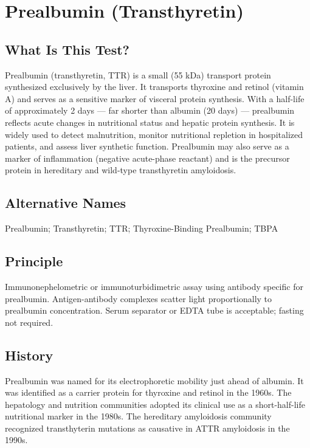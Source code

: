 \chapter{Prealbumin (Transthyretin)}

\section*{What Is This Test?}
Prealbumin (transthyretin, TTR) is a small (55 kDa) transport protein synthesized exclusively by the liver. It transports thyroxine and retinol (vitamin A) and serves as a sensitive marker of visceral protein synthesis. With a half-life of approximately 2 days --- far shorter than albumin (20 days) --- prealbumin reflects acute changes in nutritional status and hepatic protein synthesis. It is widely used to detect malnutrition, monitor nutritional repletion in hospitalized patients, and assess liver synthetic function. Prealbumin may also serve as a marker of inflammation (negative acute-phase reactant) and is the precursor protein in hereditary and wild-type transthyretin amyloidosis.

\section*{Alternative Names}
Prealbumin; Transthyretin; TTR; Thyroxine-Binding Prealbumin; TBPA

\section*{Principle}
Immunonephelometric or immunoturbidimetric assay using antibody specific for prealbumin. Antigen-antibody complexes scatter light proportionally to prealbumin concentration. Serum separator or EDTA tube is acceptable; fasting not required.

\section*{History}
Prealbumin was named for its electrophoretic mobility just ahead of albumin. It was identified as a carrier protein for thyroxine and retinol in the 1960s. The hepatology and nutrition communities adopted its clinical use as a short-half-life nutritional marker in the 1980s. The hereditary amyloidosis community recognized transthyterin mutations as causative in ATTR amyloidosis in the 1990s.

